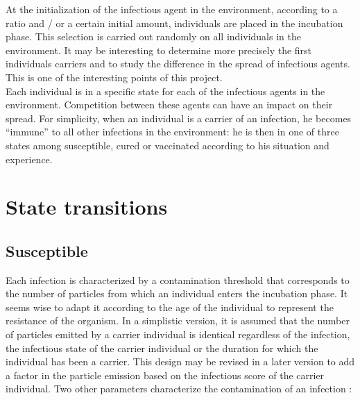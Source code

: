 At the initialization of the infectious agent in the environment, according to a ratio and / or a certain initial amount, individuals are placed in the incubation phase. This selection is carried out randomly on all individuals in the environment. It may be interesting to determine more precisely the first individuals carriers and to study the difference in the spread of infectious agents. This is one of the interesting points of this project.\\

Each individual is in a specific state for each of the infectious agents in the environment. Competition between these agents can have an impact on their spread. For simplicity, when an individual is a carrier of an infection, he becomes ``immune'' to all other infections in the environment: he is then in one of three states among susceptible, cured or vaccinated according to his situation and experience.\\

\newpage

\section{State transitions}

\subsection{Susceptible}

Each infection is characterized by a contamination threshold that corresponds to the number of particles from which an individual enters the incubation phase. It seems wise to adapt it according to the age of the individual to represent the resistance of the organism. In a simplistic version, it is assumed that the number of particles emitted by a carrier individual is identical regardless of the infection, the infectious state of the carrier individual or the duration for which the individual has been a carrier. This design may be revised in a later version to add a factor in the particle emission based on the infectious score of the carrier individual. Two other parameters characterize the contamination of an infection :\\

